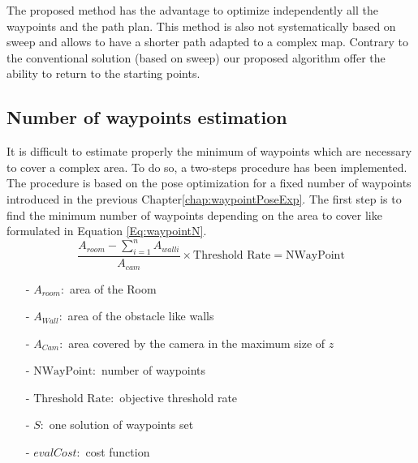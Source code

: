 The proposed method has the advantage to optimize independently all the waypoints and the path plan. This method is also not systematically based on sweep and allows to have a shorter path adapted to a complex map. 
Contrary to the conventional solution (based on sweep) our proposed  algorithm offer the ability to  return to the starting points. %


\subsection{Number of waypoints estimation}\label{sec:NmbWaypoint}

It is difficult to estimate properly the minimum of waypoints which are necessary to cover a complex area.
To do so, a two-steps procedure has been implemented. The procedure is based on the pose optimization for a fixed number of waypoints introduced in the previous Chapter\ref{chap:waypointPoseExp}. 
The first step is to find the minimum number of waypoints depending on the area to cover like formulated in Equation \ref{Eq:waypointN}. \\
\begin{equation}\label{Eq:waypointN}
\frac{ A_{room} - \sum_{i=1}^n A_{wall i} }{A_{cam}} \times \mbox{Threshold Rate} = \mbox{NWayPoint}
\end{equation}

\begin{itemize}
\item[-] $ A_{room}: $  area of the Room %
\item[-] $ A_{Wall}: $  area of the obstacle like walls %
\item[-] $ A_{Cam}: $   area covered by the camera in the maximum size of $z$
\item[-] $ \mbox{NWayPoint}: $  number of waypoints
\item[-] $ \mbox{Threshold Rate}: $ objective threshold rate 
\item[-] $S:$ one solution of waypoints set 
\item[-] $evalCost:$ cost function  
\end{itemize}

